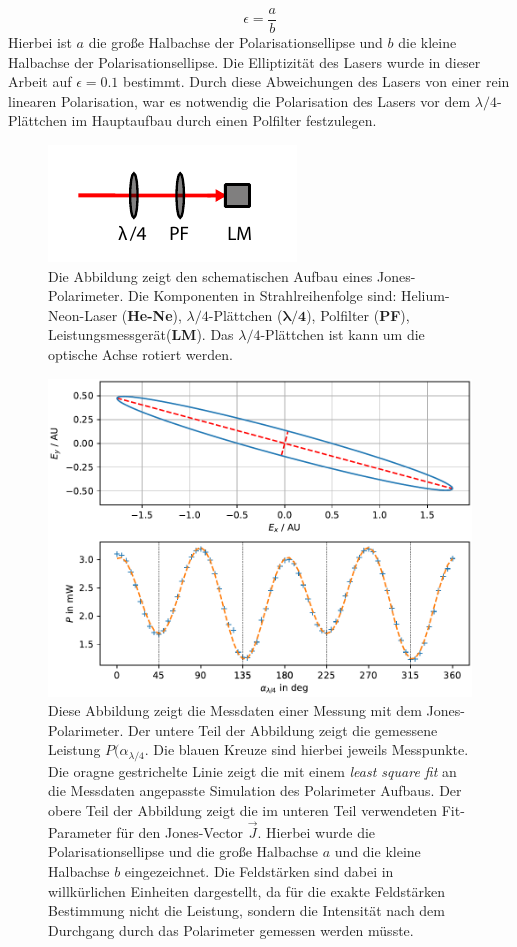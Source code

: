 \documentclass[titlepage,  ngerman]{article}
\begin{document}
	\begin{equation}
		\epsilon = \dfrac{a}{b}
	\end{equation}
	Hierbei ist $a$ die große Halbachse der Polarisationsellipse und $b$ die kleine Halbachse der Polarisationsellipse. Die Elliptizität des Lasers wurde in dieser Arbeit auf $\epsilon = 0.1 $ bestimmt. Durch diese Abweichungen des Lasers von einer rein linearen Polarisation, war es notwendig die Polarisation des Lasers vor dem $\lambda /4$-Plättchen im Hauptaufbau durch einen Polfilter festzulegen.
	\begin{figure}
		\centering
		\includegraphics[width=0.5\linewidth]{figures/Polarimeter}
		\caption[Jones-Polarimeter]{Die Abbildung zeigt den schematischen Aufbau eines Jones-Polarimeter. Die Komponenten in Strahlreihenfolge sind: Helium-Neon-Laser (\textbf{He-Ne}), $\lambda/4$-Plättchen ($\boldsymbol{\lambda / 4}$), Polfilter (\textbf{PF}), Leistungsmessgerät(\textbf{LM}). Das $\lambda/4$-Plättchen ist kann um die optische Achse rotiert werden.}
		\label{fig:polarimeter}
	\end{figure}
	\begin{figure}
		\centering
		\includegraphics[width=0.7\linewidth]{figures/graph_polarimeter}
		\caption[Polarimeter Simulation]{Diese Abbildung zeigt die Messdaten einer Messung mit dem Jones-Polarimeter. Der untere Teil der Abbildung zeigt die gemessene Leistung $P(\alpha_{\lambda /4}$. Die blauen Kreuze sind hierbei jeweils Messpunkte. Die oragne gestrichelte Linie zeigt die mit einem \textit{least square fit} an die Messdaten angepasste Simulation des Polarimeter Aufbaus. Der obere Teil der Abbildung zeigt die im unteren Teil verwendeten Fit-Parameter für den Jones-Vector $\vec{J}$. Hierbei wurde die Polarisationsellipse und die große Halbachse $a$ und die kleine Halbachse $b$ eingezeichnet. Die Feldstärken sind dabei in willkürlichen Einheiten dargestellt, da für die exakte Feldstärken Bestimmung nicht die Leistung, sondern die Intensität nach dem Durchgang durch das Polarimeter gemessen werden müsste.}
		\label{fig:graphpolarimeter}
	\end{figure}
\end{document}
